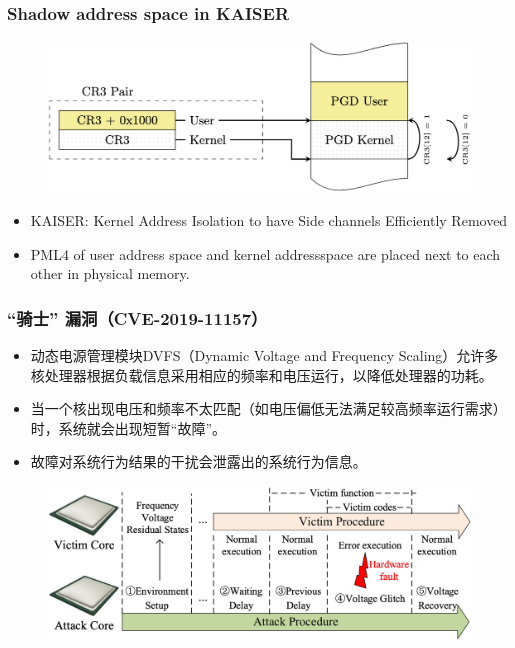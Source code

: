 \begin{frame}
    \frametitle{Shadow address space in KAISER}
	  	\begin{figure}
	  	\includegraphics[width=0.8\linewidth]{figs/kaiser-shadow-AS.png}
	  	\end{figure}
    \begin{itemize}
        \item KAISER: Kernel Address Isolation to have Side channels Efficiently Removed \pause
        \item PML4 of user address space and kernel addressspace are placed next to each other in physical memory.
    \end{itemize}

\end{frame}
% 
% 
% 
% 
% 
% 
\begin{frame}
    \frametitle{“骑士” 漏洞（CVE-2019-11157）}
    \begin{itemize}
        \item 动态电源管理模块DVFS（Dynamic Voltage and Frequency Scaling）允许多核处理器根据负载信息采用相应的频率和电压运行，以降低处理器的功耗。 \pause
        \item 当一个核出现电压和频率不太匹配（如电压偏低无法满足较高频率运行需求）时，系统就会出现短暂“故障”。 \pause
        \item 故障对系统行为结果的干扰会泄露出的系统行为信息。 \pause
    \end{itemize}
  	\begin{figure}
  	\includegraphics[width=0.8\linewidth]{figs/VoltJockey.png}
  	\end{figure}

\end{frame}
